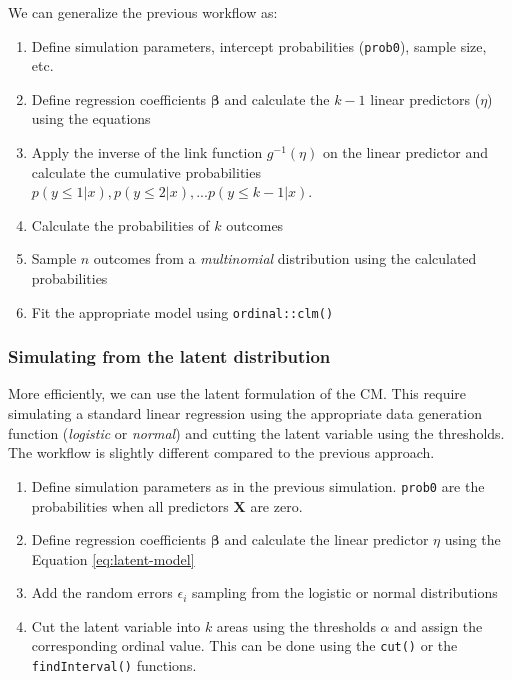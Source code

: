 \documentclass[
  man,floatsintext]{apa6}
\providecommand{\tightlist}{%
  \setlength{\itemsep}{0pt}\setlength{\parskip}{0pt}}
\begin{document}
\normalsize

We can generalize the previous workflow as:

\begin{enumerate}
\def\labelenumi{\arabic{enumi}.}
\tightlist
\item
  Define simulation parameters, intercept probabilities (\texttt{prob0}), sample size, etc.
\item
  Define regression coefficients \(\boldsymbol{\beta}\) and calculate the \(k - 1\) linear predictors (\(\eta\)) using the equations
\item
  Apply the inverse of the link function \(g^{-1}(\eta)\) on the linear predictor and calculate the cumulative probabilities \(p(y \leq 1|x), p(y \leq 2|x), ... p(y \leq k - 1|x)\).
\item
  Calculate the probabilities of \(k\) outcomes
\item
  Sample \(n\) outcomes from a \emph{multinomial} distribution using the calculated probabilities
\item
  Fit the appropriate model using \texttt{ordinal::clm()}
\end{enumerate}

\subsubsection{Simulating from the latent distribution}\label{simulating-from-the-latent-distribution}

More efficiently, we can use the latent formulation of the CM. This require simulating a standard linear regression using the appropriate data generation function (\emph{logistic} or \emph{normal}) and cutting the latent variable using the thresholds. The workflow is slightly different compared to the previous approach.

\begin{enumerate}
\def\labelenumi{\arabic{enumi}.}
\tightlist
\item
  Define simulation parameters as in the previous simulation. \texttt{prob0} are the probabilities when all predictors \(\mathbf{X}\) are zero.
\item
  Define regression coefficients \(\boldsymbol{\beta}\) and calculate the linear predictor \(\eta\) using the Equation \eqref{eq:latent-model}
\item
  Add the random errors \(\epsilon_i\) sampling from the logistic or normal distributions
\item
  Cut the latent variable into \(k\) areas using the thresholds \(\alpha\) and assign the corresponding ordinal value. This can be done using the \texttt{cut()} or the \texttt{findInterval()} functions.
\end{enumerate}
\end{document}
